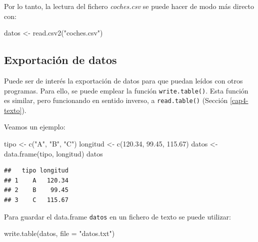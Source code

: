 \documentclass[
]{book}
\newenvironment{Shaded}{\begin{snugshade}}{\end{snugshade}}
\newcommand{\AttributeTok}[1]{\textcolor[rgb]{0.77,0.63,0.00}{#1}}
\newcommand{\FloatTok}[1]{\textcolor[rgb]{0.00,0.00,0.81}{#1}}
\newcommand{\FunctionTok}[1]{\textcolor[rgb]{0.00,0.00,0.00}{#1}}
\newcommand{\NormalTok}[1]{#1}
\newcommand{\OtherTok}[1]{\textcolor[rgb]{0.56,0.35,0.01}{#1}}
\newcommand{\StringTok}[1]{\textcolor[rgb]{0.31,0.60,0.02}{#1}}
\theoremstyle{break}
\begin{document}
Por lo tanto, la lectura del fichero \emph{coches.csv} se puede hacer de modo
más directo con:

\begin{Shaded}
\begin{Highlighting}[]
\NormalTok{datos }\OtherTok{\textless{}{-}} \FunctionTok{read.csv2}\NormalTok{(}\StringTok{"coches.csv"}\NormalTok{)}
\end{Highlighting}
\end{Shaded}

\hypertarget{exportaciuxf3n-de-datos}{%
\subsection{Exportación de datos}\label{exportaciuxf3n-de-datos}}

Puede ser de interés la
exportación de datos para que puedan leídos con otros programas. Para
ello, se puede emplear la función \texttt{write.table()}. Esta función es
similar, pero funcionando en sentido inverso, a \texttt{read.table()}
(Sección \ref{cap4-texto}).

Veamos un ejemplo:

\begin{Shaded}
\begin{Highlighting}[]
\NormalTok{tipo }\OtherTok{\textless{}{-}} \FunctionTok{c}\NormalTok{(}\StringTok{"A"}\NormalTok{, }\StringTok{"B"}\NormalTok{, }\StringTok{"C"}\NormalTok{)}
\NormalTok{longitud }\OtherTok{\textless{}{-}} \FunctionTok{c}\NormalTok{(}\FloatTok{120.34}\NormalTok{, }\FloatTok{99.45}\NormalTok{, }\FloatTok{115.67}\NormalTok{)}
\NormalTok{datos }\OtherTok{\textless{}{-}} \FunctionTok{data.frame}\NormalTok{(tipo, longitud)}
\NormalTok{datos}
\end{Highlighting}
\end{Shaded}

\begin{verbatim}
##   tipo longitud
## 1    A   120.34
## 2    B    99.45
## 3    C   115.67
\end{verbatim}

Para guardar el data.frame \texttt{datos} en un fichero de texto se
puede utilizar:

\begin{Shaded}
\begin{Highlighting}[]
\FunctionTok{write.table}\NormalTok{(datos, }\AttributeTok{file =} \StringTok{"datos.txt"}\NormalTok{)}
\end{Highlighting}
\end{Shaded}
\end{document}
